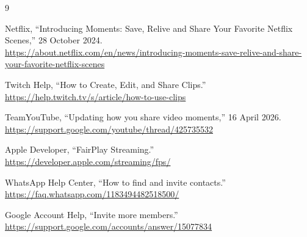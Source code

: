 \documentclass[11pt,a4paper]{article}
\begin{document}
\begin{thebibliography}{9}

Netflix, ``Introducing Moments: Save, Relive and Share Your Favorite Netflix
Scenes,'' 28 October 2024.\\
\url{https://about.netflix.com/en/news/introducing-moments-save-relive-and-share-your-favorite-netflix-scenes}

Twitch Help, ``How to Create, Edit, and Share Clips.''\\
\url{https://help.twitch.tv/s/article/how-to-use-clips}

TeamYouTube, ``Updating how you share video moments,'' 16 April 2026.\\
\url{https://support.google.com/youtube/thread/425735532}

Apple Developer, ``FairPlay Streaming.''\\
\url{https://developer.apple.com/streaming/fps/}

WhatsApp Help Center, ``How to find and invite contacts.''\\
\url{https://faq.whatsapp.com/1183494482518500/}

Google Account Help, ``Invite more members.''\\
\url{https://support.google.com/accounts/answer/15077834}

\end{thebibliography}
\end{document}
